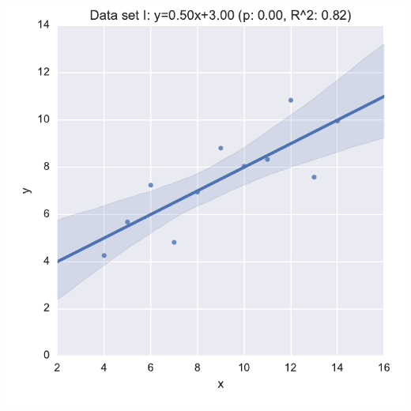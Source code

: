 \documentclass{beamer}
\begin{document}
\begin{frame}
	\begin{columns}
        \begin{column}{.5\textwidth}
            \begin{center}
                \includegraphics[width=.8\textwidth]{./img/anscombe-I.pdf}


\end{center}
\end{column}
\end{columns}
\end{frame}
\end{document}
